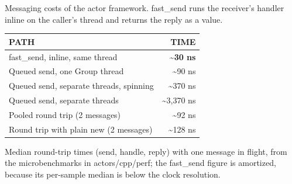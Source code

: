 \documentclass[10pt]{article}
\newcommand{\code}[1]{{\ttfamily\small #1}}
\newcommand{\tnote}[1]{{\color{ink2}\footnotesize #1\par}}
\begin{document}
Messaging costs of the actor framework. \code{fast\_send} runs the
receiver's handler inline on the caller's thread and returns the reply as a value.

\vspace{3pt}
\noindent\begin{tabularx}{\textwidth}{@{}Xr@{}}
\toprule
{\color{ink3}\sffamily\bfseries\scriptsize PATH} &
{\color{ink3}\sffamily\bfseries\scriptsize TIME} \\
\midrule
\code{fast\_send}, inline, same thread & {\color{accent}\bfseries\code{\textasciitilde30 ns}} \\
Queued send, one \code{Group} thread & \code{\textasciitilde90 ns} \\
Queued send, separate threads, spinning & \code{\textasciitilde370 ns} \\
Queued send, separate threads & \code{\textasciitilde3{,}370 ns} \\
\midrule
Pooled round trip (2 messages) & \code{\textasciitilde92 ns} \\
Round trip with plain \code{new} (2 messages) & \code{\textasciitilde128 ns} \\
\bottomrule
\end{tabularx}

\vspace{3pt}
\tnote{Median round-trip times (send, handle, reply) with one message in flight, from
the microbenchmarks in \code{actors/cpp/perf}; the \code{fast\_send} figure is amortized, because its
per-sample median is below the clock resolution.}


\end{document}
